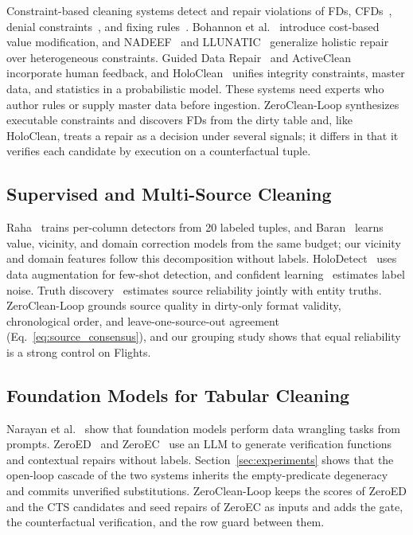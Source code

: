 \documentclass[conference]{IEEEtran}
\begin{document}
Constraint-based cleaning systems detect and repair violations of FDs, CFDs~\cite{fan2008conditional}, denial constraints~\cite{chu2013holistic}, and fixing rules~\cite{wang2014towards}. Bohannon et al.~\cite{bohannon2005cost} introduce cost-based value modification, and NADEEF~\cite{dallachiesa2013nadeef} and LLUNATIC~\cite{geerts2013llunatic} generalize holistic repair over heterogeneous constraints. Guided Data Repair~\cite{yakout2011guided} and ActiveClean~\cite{krishnan2016activeclean} incorporate human feedback, and HoloClean~\cite{rekatsinas2017holoclean} unifies integrity constraints, master data, and statistics in a probabilistic model. These systems need experts who author rules or supply master data before ingestion. ZeroClean-Loop synthesizes executable constraints and discovers FDs from the dirty table and, like HoloClean, treats a repair as a decision under several signals; it differs in that it verifies each candidate by execution on a counterfactual tuple.

\subsection{Supervised and Multi-Source Cleaning}
\label{subsec:rel_supervised}

Raha~\cite{mahdavi2019raha} trains per-column detectors from 20 labeled tuples, and Baran~\cite{mahdavi2020baran} learns value, vicinity, and domain correction models from the same budget; our vicinity and domain features follow this decomposition without labels. HoloDetect~\cite{heidari2019holodetect} uses data augmentation for few-shot detection, and confident learning~\cite{northcutt2021confident} estimates label noise. Truth discovery~\cite{dong2009data,li2014confidence} estimates source reliability jointly with entity truths. ZeroClean-Loop grounds source quality in dirty-only format validity, chronological order, and leave-one-source-out agreement (Eq.~\eqref{eq:source_consensus}), and our grouping study shows that equal reliability is a strong control on Flights.

\subsection{Foundation Models for Tabular Cleaning}
\label{subsec:rel_llm}

Narayan et al.~\cite{narayan2022can} show that foundation models perform data wrangling tasks from prompts. ZeroED~\cite{ni2025zeroed} and ZeroEC~\cite{chen2025zeroec} use an LLM to generate verification functions and contextual repairs without labels. Section~\ref{sec:experiments} shows that the open-loop cascade of the two systems inherits the empty-predicate degeneracy and commits unverified substitutions. ZeroClean-Loop keeps the scores of ZeroED and the CTS candidates and seed repairs of ZeroEC as inputs and adds the gate, the counterfactual verification, and the row guard between them.
\end{document}
